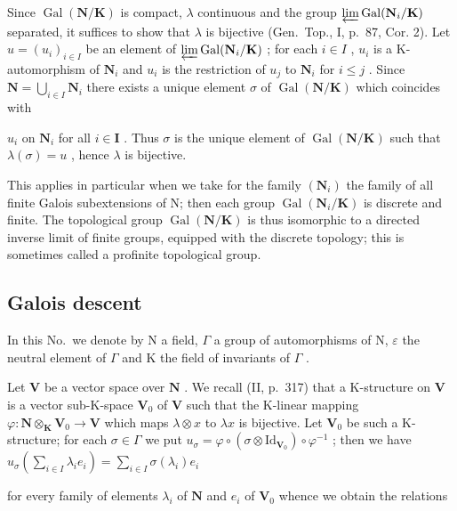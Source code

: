Since \(\operatorname{Gal}(\mathbf{N}/\mathbf{K})\) is compact, \(\lambda\) continuous and the group \(\varprojlim \operatorname{Gal}(\mathbf{N}_i/\mathbf{K})\) separated, it suffices to show that \(\lambda\) is bijective (Gen.~Top., I, p.~87, Cor. 2). Let \(u = (u_i)_{i \in I}\) be an element of \(\varprojlim \operatorname{Gal}(\mathbf{N}_i/\mathbf{K})\) ; for each \(i \in I\) , \(u_i\) is a K-automorphism of \(\mathbf{N}_i\) and \(u_i\) is the restriction of \(u_j\) to \(\mathbf{N}_i\) for \(i \leqslant j\) . Since \(\mathbf{N} = \bigcup_{i \in I} \mathbf{N}_i\) there exists a unique element \(\sigma\) of \(\operatorname{Gal}(\mathbf{N}/\mathbf{K})\) which coincides with

\(u_{i}\) on \(\mathbf{N}_i\) for all \(i\in \mathbf{I}\) . Thus \(\sigma\) is the unique element of \(\operatorname {Gal}(\mathbf{N} / \mathbf{K})\) such that \(\lambda (\sigma) = u\) , hence \(\lambda\) is bijective.

This applies in particular when we take for the family \((\mathbf{N}_{i})\) the family of all finite Galois subextensions of N; then each group \(\operatorname{Gal}(\mathbf{N}_{i}/\mathbf{K})\) is discrete and finite. The topological group \(\operatorname{Gal}(\mathbf{N}/\mathbf{K})\) is thus isomorphic to a directed inverse limit of finite groups, equipped with the discrete topology; this is sometimes called a profinite topological group.

\subsection{Galois descent}

In this No.~we denote by N a field, \(\Gamma\) a group of automorphisms of N, \(\varepsilon\) the neutral element of \(\Gamma\) and K the field of invariants of \(\Gamma\) .

Let \(\mathbf{V}\) be a vector space over \(\mathbf{N}\) . We recall (II, p.~317) that a K-structure on \(\mathbf{V}\) is a vector sub-K-space \(\mathbf{V}_0\) of \(\mathbf{V}\) such that the K-linear mapping \(\varphi: \mathbf{N} \otimes_{\mathbf{K}} \mathbf{V}_0 \to \mathbf{V}\) which maps \(\lambda \otimes x\) to \(\lambda x\) is bijective. Let \(\mathbf{V}_0\) be such a K-structure; for each \(\sigma \in \Gamma\) we put \(u_\sigma = \varphi \circ (\sigma \otimes \mathrm{Id}_{\mathbf{V}_0}) \circ \varphi^{-1}\) ; then we have \(u_\sigma \left( \sum_{i \in I} \lambda_i e_i \right) = \sum_{i \in I} \sigma(\lambda_i) e_i\)

for every family of elements \(\lambda_{i}\) of \(\mathbf{N}\) and \(e_i\) of \(\mathbf{V}_0\) whence we obtain the relations

